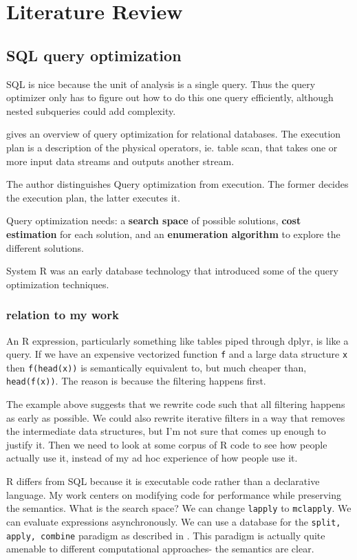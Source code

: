 \documentclass[12pt]{article}
\begin{document}
\section{Literature Review}


\subsection{SQL query optimization}

SQL is nice because the unit of analysis is a single query. Thus the query
optimizer only has to figure out how to do this one query efficiently,
although nested subqueries could add complexity.

\cite{Chaudhuri:1998:OQO:275487.275492} gives an overview of query
optimization for relational databases. The execution plan is a description
of the physical operators, ie. table scan, that takes one or more input
data streams and outputs another stream.

The author distinguishes Query optimization from execution. The former
decides the execution plan, the latter executes it.

Query optimization needs: a \textbf{search space} of possible solutions,
\textbf{cost estimation} for each solution, and an \textbf{enumeration
algorithm} to explore the different solutions.

System R was an early database technology that introduced some of the
query optimization techniques.

\subsubsection{relation to my work}

An R expression, particularly something like tables piped through dplyr, is
like a query. If we have an expensive vectorized function \texttt{f} and a
large data structure \texttt{x} then \texttt{f(head(x))} is semantically
equivalent to, but much cheaper than, \texttt{head(f(x))}. The reason is
because the filtering happens first.

The example above suggests that we rewrite code such that all filtering
happens as early as possible. We could also rewrite iterative filters in a
way that removes the intermediate data structures, but I'm not sure that
comes up enough to justify it. Then we need to look at some corpus of R
code to see how people actually use it, instead of my ad hoc experience of
how people use it.

R differs from SQL because it is executable code rather than a declarative
language. My work centers on modifying code for performance while
preserving the semantics. What is the search space?  We can change
\texttt{lapply} to \texttt{mclapply}. We can evaluate expressions
asynchronously. We can use a database for the \texttt{split, apply,
combine} paradigm as described in \cite{wickham2011split}. This paradigm is
actually quite amenable to different computational approaches- the
semantics are clear.
\end{document}
